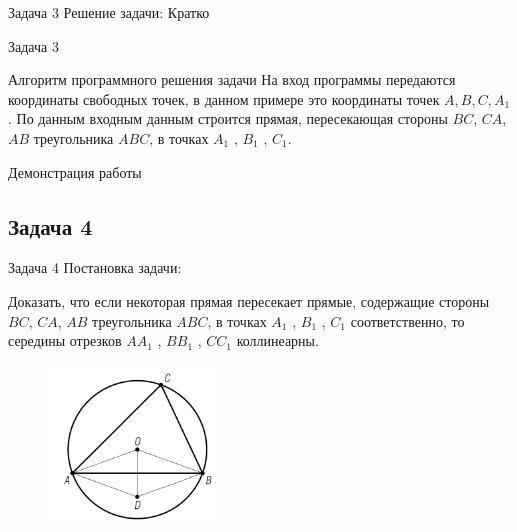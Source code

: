 \documentclass{beamer}
\begin{document}
\begin{frame}
   \begin{block}{Задача 3}
      Решение задачи:
      Кратко
   \end{block}
\end{frame}

\begin{frame}
   \begin{block}{Задача 3}
      \begin{block}{Алгоритм программного решения задачи}
         На вход программы передаются координаты свободных точек, в данном примере это координаты точек \(A,B,C,A_1\). По данным входным данным строится прямая, пересекающая стороны \(BC\), \(CA\), \(AB\) треугольника \(ABC\), в точках \(A_1\) , \(B_1\) , \(C_1\).
      \end{block}
   \end{block}
\end{frame}

\begin{frame}
   Демонстрация работы
\end{frame}

\begin{frame}
   \subsection{Задача 4}
   \begin{block}{Задача 4}
      Постановка задачи:

      Доказать, что если некоторая прямая пересекает прямые, содержащие стороны \(BC\), \(CA\), \(AB\) треугольника \(ABC\), в точках \(A_1\) , \(B_1\) , \(C_1\) соответственно, то середины отрезков \(AA_1\) , \(BB_1\) , \(CC_1\) коллинеарны.

      \begin{figure}[h]
         \centering
         \includegraphics[width=0.4\textwidth]{images/task1.png}
         \label{task4}
      \end{figure}
   \end{block}
\end{frame}
\end{document}
